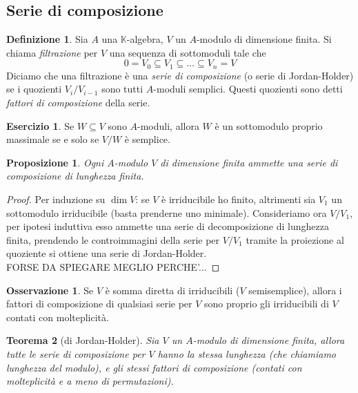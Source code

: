 \documentclass[11pt]{article}
\theoremstyle{plain}
\newtheorem{thm}{Teorema}[section]
\newtheorem{prop}[thm]{Proposizione}
\theoremstyle{definition}
\newtheorem{defn}{Definizione}[section]
\newtheorem{exercise}{Esercizio}[section]
\newtheorem*{rem}{Osservazione}
\theoremstyle{remark}
\newcommand{\K}{\mathbb{K}}
\begin{document}
\subsection{Serie di composizione}
	\begin{defn}
		Sia $A$ una $\K$-algebra, $V$ un $A$-modulo di dimensione finita. Si chiama \textit{filtrazione} per $V$ una sequenza di sottomoduli tale che
		\[
			0=V_0\subseteq V_1\subseteq \ldots \subseteq V_n=V
		\]
		Diciamo che una filtrazione è una \textit{serie di composizione} (o serie di Jordan-Holder) se i quozienti $\displaystyle V_i/V_{i-1}$ sono tutti $A$-moduli semplici. Questi quozienti sono detti \textit{fattori di composizione} della serie.
	\end{defn}
	\begin{exercise}
		Se $W\subseteq V$ sono $A$-moduli, allora $W$ è un sottomodulo proprio massimale se e solo se $V/W$ è semplice.
	\end{exercise}
	\begin{prop}
		Ogni $A$-modulo $V$ di dimensione finita ammette una serie di composizione di lunghezza finita.
	\end{prop}
	\begin{proof}
		Per induzione su $\dim V$: se $V$ è irriducibile ho finito, altrimenti sia $V_1$ un sottomodulo irriducibile (basta prenderne uno minimale). Consideriamo ora $V/V_1$, per ipotesi induttiva esso ammette una serie di decomposizione di lunghezza finita, prendendo le controimmagini della serie per $V/V_1$ tramite la proiezione al quoziente si ottiene una serie di Jordan-Holder.
		\\FORSE DA SPIEGARE MEGLIO PERCHE'...
	\end{proof}
	\begin{rem}
		Se $V$ è somma diretta di irriducibili ($V$ semisemplice), allora i fattori di composizione di qualsiasi serie per $V$ sono proprio gli irriducibili di $V$ contati con molteplicità.
	\end{rem}
	\begin{thm}[di Jordan-Holder]\label{thm:jordan-holder}
		Sia $V$ un $A$-modulo di dimensione finita, allora tutte le serie di composizione per $V$ hanno la stessa lunghezza (che chiamiamo lunghezza del modulo), e gli stessi fattori di composizione (contati con molteplicità e a meno di permutazioni).
	\end{thm}
\end{document}
